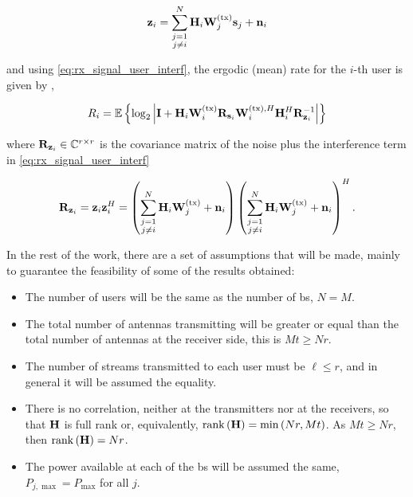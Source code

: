 \begin{equation} \label{eq:interf_plus_noise}
    \mathbf{z}_i = \sum\limits_{\substack{j = 1\\j \neq i}}^{N} \mathbf{H}_i \mathbf{W}^{(\text{tx})}_j
    \mathbf{s}_j + \mathbf{n}_i
\end{equation}

\noindent
and using \eqref{eq:rx_signal_user_interf}, the ergodic (mean) rate for the
$i$-th user is given by \cite{cover_thomas}, \cite{holter01}

\begin{equation} \label{eq:generic_ergodic_capacity}
    R_i = \mathbb{E}\left\{
        \log_2\left| \mathbf{I} + \mathbf{H}_i\mathbf{W}^{(\text{tx})}_i\mathbf{R}_{\mathbf{s}_i}\mathbf{W}^{(\text{tx}),H}_i\mathbf{H}_i^H \mathbf{R}_{\mathbf{z}_i}^{-1}
    \right|
    \right\}
\end{equation}

\noindent
where $\mathbf{R}_{\mathbf{z}_i} \in \mathbb{C}^{r \times r}$ is the covariance matrix of the noise
plus the interference term in \eqref{eq:rx_signal_user_interf}

\begin{equation} \label{eq:r_in}
    \mathbf{R}_{\mathbf{z}_i} = \mathbf{z}_i \mathbf{z}_i^H = 
    \left(\sum\limits_{\substack{j=1\\j\neq i}}^{N} \mathbf{H}_i\mathbf{W}^{(\text{tx})}_j+\mathbf{n}_i
    \right)
    \left(\sum\limits_{\substack{j=1\\j\neq i}}^{N} \mathbf{H}_i\mathbf{W}^{(\text{tx})}_j+\mathbf{n}_i
    \right)^H.
\end{equation}

In the rest of the work, there are a set of assumptions that will be made,
mainly to guarantee the feasibility of some of the results obtained:

\begin{itemize}
    \item The number of users will be the same as the number of \gls{bs},
        \ie $N = M$.
    \item The total number of antennas transmitting will be greater or equal
        than the total number of antennas at the receiver side, this is $Mt
		\geq Nr$.
    \item The number of streams transmitted to each user must be $\ell \leq r$,
        and in general it will be assumed the equality.
    \item There is no correlation, neither at the transmitters nor at the
        receivers, so that $\mathbf{H}$ is full rank or, equivalently, $\operatorname*{rank}\left(
        \mathbf{H}\right) = \min\left(Nr,Mt\right)$. As $Mt \geq Nr$, then $\operatorname*{rank}\left(
        \mathbf{H}\right) = Nr$.
    \item The power available at each of the \gls{bs} will be assumed the same,
        \ie $P_{j, \max} = P_{\max}$ for all $j$.
\end{itemize}

